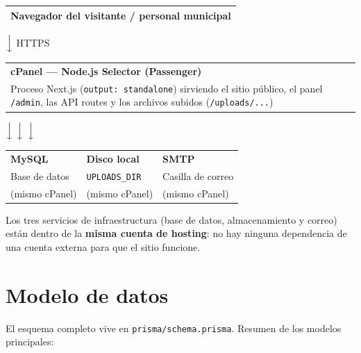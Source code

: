 \documentclass[11pt,a4paper]{article}
\begin{document}
\begin{center}
\begin{tabular}{|p{13.5cm}|}
\hline
\textbf{Navegador del visitante / personal municipal} \\
\hline
\end{tabular}

$\Big\downarrow$ HTTPS

\begin{tabular}{|p{13.5cm}|}
\hline
\textbf{cPanel — Node.js Selector (Passenger)} \\
Proceso Next.js (\texttt{output: standalone}) sirviendo el sitio público, el panel \texttt{/admin}, las API routes y los archivos subidos (\texttt{/uploads/...}) \\
\hline
\end{tabular}

$\Big\downarrow$ \hspace{2cm} $\Big\downarrow$ \hspace{2cm} $\Big\downarrow$

\begin{tabular}{|p{4cm}|p{4cm}|p{4cm}|}
\hline
\textbf{MySQL} & \textbf{Disco local} & \textbf{SMTP} \\
Base de datos & \texttt{UPLOADS\_DIR} & Casilla de correo \\
(mismo cPanel) & (mismo cPanel) & (mismo cPanel) \\
\hline
\end{tabular}
\end{center}

\noindent Los tres servicios de infraestructura (base de datos, almacenamiento y correo) están dentro de la \textbf{misma cuenta de hosting}: no hay ninguna dependencia de una cuenta externa para que el sitio funcione.

\section{Modelo de datos}
\label{sec:schema}

El esquema completo vive en \texttt{prisma/schema.prisma}. Resumen de los modelos principales:
\end{document}
